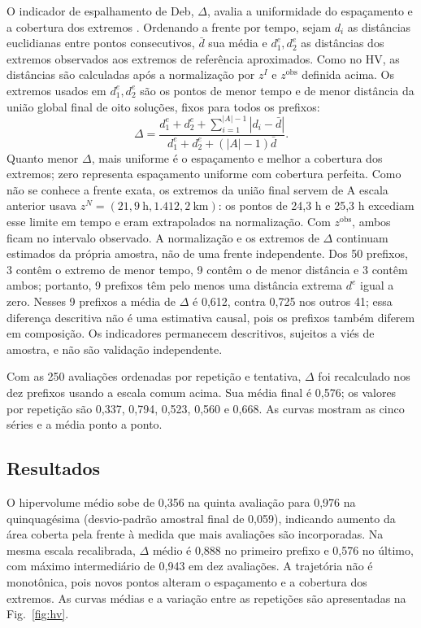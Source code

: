 \documentclass[conference]{IEEEtran}
\begin{document}
O indicador de espalhamento de Deb, $\Delta$, avalia a uniformidade do
espaçamento e a cobertura dos extremos \cite{deb}. Ordenando a frente por
tempo, sejam $d_i$ as distâncias euclidianas entre pontos consecutivos,
$\bar d$ sua média e $d^e_1,d^e_2$ as distâncias dos extremos observados aos
extremos de referência aproximados. Como no HV, as distâncias são calculadas
após a normalização por $z^I$ e $z^{\mathrm{obs}}$ definida acima. Os
extremos usados em $d^e_1,d^e_2$ são os pontos de menor tempo e de menor
distância da união global final de oito soluções, fixos para todos os
prefixos:
\begin{equation}
\Delta =
\frac{d^e_1+d^e_2+\sum_{i=1}^{|A|-1}|d_i-\bar d|}
{d^e_1+d^e_2+(|A|-1)\bar d}.
\end{equation}
Quanto menor $\Delta$, mais uniforme é o espaçamento e melhor a cobertura
dos extremos; zero representa espaçamento uniforme com cobertura perfeita.
Como não se conhece a frente exata, os extremos da união final servem de
A escala anterior usava $z^N=(21{,}9\ \mathrm{h},1.412{,}2\ \mathrm{km})$:
os pontos de 24,3 h e 25,3 h excediam esse limite em tempo e eram extrapolados
na normalização. Com $z^{\mathrm{obs}}$, ambos ficam no intervalo observado.
A normalização e os extremos de $\Delta$ continuam estimados da própria
amostra, não de uma frente independente. Dos 50 prefixos, 3 contêm o extremo
de menor tempo, 9 contêm o de menor distância e 3 contêm ambos; portanto, 9
prefixos têm pelo menos uma distância extrema $d^e$ igual a zero. Nesses 9
prefixos a média de $\Delta$ é 0,612, contra 0,725 nos outros 41; essa
diferença descritiva não é uma estimativa causal, pois os prefixos também
diferem em composição. Os indicadores permanecem descritivos, sujeitos a viés
de amostra, e não são validação independente.

Com as 250 avaliações ordenadas por repetição e tentativa, $\Delta$ foi
recalculado nos dez prefixos usando a escala comum acima. Sua média final é
0,576; os valores por repetição são 0,337, 0,794, 0,523, 0,560 e 0,668.
As curvas mostram as cinco séries e a média ponto a ponto.

\subsection{Resultados}

O hipervolume médio sobe de 0,356 na quinta avaliação para 0,976 na
quinquagésima (desvio-padrão amostral final de 0,059), indicando aumento da
área coberta pela frente à medida que mais avaliações são incorporadas. Na
mesma escala recalibrada, $\Delta$ médio é 0,888 no primeiro prefixo e 0,576
no último, com máximo intermediário de 0,943 em dez avaliações. A trajetória
não é monotônica, pois novos pontos alteram o espaçamento e a cobertura dos
extremos. As curvas médias e a variação entre as repetições são apresentadas
na Fig.~\ref{fig:hv}.
\end{document}

